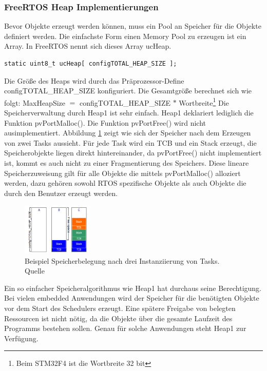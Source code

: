 \subsubsection{FreeRTOS Heap Implementierungen}
Bevor Objekte erzeugt werden können, muss ein Pool an Speicher für die Objekte definiert werden. Die einfachste Form einen Memory Pool zu erzeugen ist ein Array. In FreeRTOS nennt sich dieses Array ucHeap. 
\begin{lstlisting}[label=lst:ucHeap, float=hbt, numbers = none]
static uint8_t ucHeap[ configTOTAL_HEAP_SIZE ];
\end{lstlisting}
\newline
Die Größe des Heaps wird durch das Prä\-pro\-zes\-sor-Define configTOTAL\_HEAP\_SIZE konfiguriert. Die Gesamtgröße berechnet sich wie folgt:
\newline
\newline
MaxHeapSize $=$ configTOTAL\_HEAP\_SIZE $\ast$ Wortbreite\footnote{Beim STM32F4 ist die Wortbreite 32 bit} 
\newline
\newline
Die Speicherverwaltung durch Heap1 ist sehr einfach. Heap1 deklariert lediglich die Funktion pvPortMalloc(). Die Funktion pvPortFree() wird nicht ausimplementiert. Abbildung \ref{fig:Heap1} zeigt wie sich der Speicher nach dem Erzeugen von zwei Tasks aussieht. Für jede Task wird ein TCB und ein Stack erzeugt, die Speicherobjekte liegen direkt hintereinander, da pvPortFree() nicht implementiert ist, kommt es auch nicht zu einer Fragmentierung des Speichers. Diese lineare Speicherzuweisung gilt für alle Objekte die mittels pvPortMalloc() alloziert werden, dazu gehören sowohl RTOS spezifische Objekte als auch Objekte die durch den Benutzer erzeugt werden. 
\begin{figure}[ht!]
	\centering
		\includegraphics[width=0.3\textwidth]{Pictures/FreeRTOSOrg/heap1Alg.png}
	\caption{Beispiel Speicherbelegung nach drei Instanziierung von Tasks. Quelle~\protect{}}
	\label{fig:Heap1}
\end{figure}
Ein so einfacher Speicheralgorithmus wie Heap1 hat durchaus seine Berechtigung. Bei vielen embedded Anwendungen wird der Speicher für die benötigten Objekte vor dem Start des Schedulers erzeugt. Eine spätere Freigabe von belegten Ressourcen ist nicht nötig, da die Objekte über die gesamte Laufzeit des Programms bestehen sollen. Genau für solche Anwendungen steht Heap1 zur Verfügung. 
